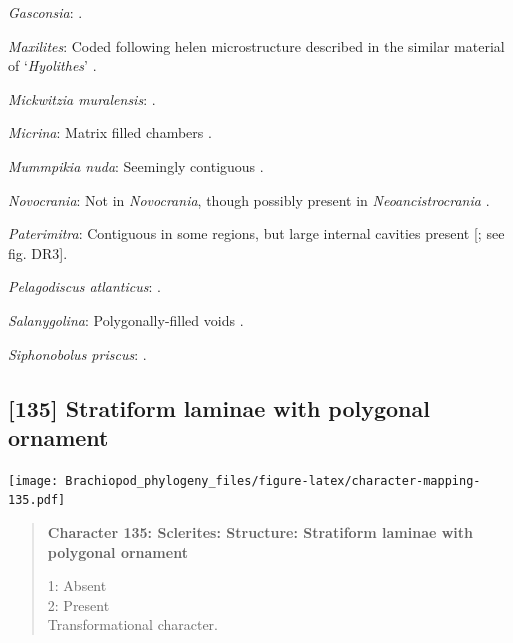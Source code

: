 \documentclass[openany]{book}
\begin{document}
\hypertarget{Gasconsia-coding-134}{}
\emph{Gasconsia}: \citet{Hanken1985Thetaxonomy}.

\hypertarget{Maxilites-coding-134}{}
\emph{Maxilites}: Coded following helen microstructure described in the
similar material of `\emph{Hyolithes}' \citep{MartiMus2007}.

\hypertarget{Mickwitzia_muralensis-coding-134}{}
\emph{Mickwitzia muralensis}: \citep{Balthasar2004Shellstructure}.

\hypertarget{Micrina-coding-134}{}
\emph{Micrina}: Matrix filled chambers \citep[fig.
DR1]{Balthasar2009Homologousskeletal}.

\hypertarget{Mummpikia_nuda-coding-134}{}
\emph{Mummpikia nuda}: Seemingly contiguous
\citep{Balthasar2008iMummpikia}.

\hypertarget{Novocrania-coding-134}{}
\emph{Novocrania}: Not in \emph{Novocrania}, though possibly present in
\emph{Neoancistrocrania} \citep{Parkinson2005}.

\hypertarget{Paterimitra-coding-134}{}
\emph{Paterimitra}: Contiguous in some regions, but large internal
cavities present {[}\citet{Balthasar2009Homologousskeletal}; see fig.
DR3{]}.

\hypertarget{Pelagodiscus_atlanticus-coding-134}{}
\emph{Pelagodiscus atlanticus}: \citet{Williams1998Chemicostructural}.

\hypertarget{Salanygolina-coding-134}{}
\emph{Salanygolina}: Polygonally-filled voids
\citep{Holmer2009Theenigmatic}.

\hypertarget{Siphonobolus_priscus-coding-134}{}
\emph{Siphonobolus priscus}: \citep{Williams2004Chemicostructure}.

\subsection*{{[}135{]} Stratiform laminae with polygonal
ornament}\label{stratiform-laminae-with-polygonal-ornament}

\texttt{[image: Brachiopod\_phylogeny\_files/figure-latex/character-mapping-135.pdf]}

\begin{quote}
\textbf{Character 135: Sclerites: Structure: Stratiform laminae with
polygonal ornament}

1: Absent\\
2: Present\\
Transformational character.
\end{quote}
\end{document}
